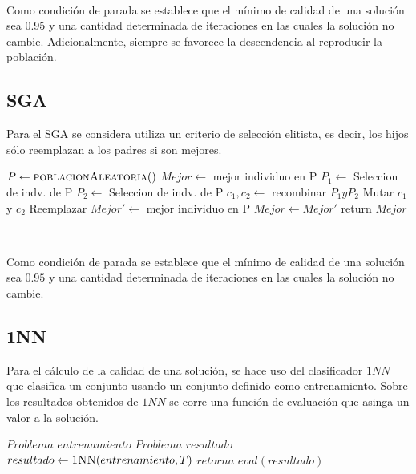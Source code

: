 \documentclass[11pt]{article}
\begin{document}
    ~\ 

    Como condición de parada se establece que el mínimo de calidad de una solución sea $0.95$ y una cantidad determinada de iteraciones en las cuales la solución no cambie. Adicionalmente, siempre se favorece la descendencia al reproducir la población.

    \subsection{SGA}
    Para el SGA se considera utiliza un criterio de selección elitista, es decir, los hijos sólo reemplazan a los padres si son mejores. \\

    {\fontsize{10}{12}\selectfont
    \begin{algorithmic}
            \State $P \gets \Call{poblacionAleatoria}$
            \State $Mejor \gets $ mejor individuo en P
                \State $P_1 \gets $ Seleccion de indv. de P  
                \State $P_2 \gets $ Seleccion de indv. de P 
                \State $c_1,c_2 \gets $ recombinar $P_1 y P_2$
                \State Mutar $c_1$ y $c_2$ 
                    \State Reemplazar
                \EndIf
                \State $Mejor' \gets $ mejor individuo en P 
                    \State $Mejor \gets Mejor'$
                \EndIf
            \EndWhile
            \State return $Mejor$
        \EndFunction
    \end{algorithmic}
    }

    ~\ 

    Como condición de parada se establece que el mínimo de calidad de una solución sea $0.95$ y una cantidad determinada de iteraciones en las cuales la solución no cambie.

\subsection{1NN}
    Para el cálculo de la calidad de una solución, se hace uso del clasificador $1NN$ que clasifica un conjunto usando un conjunto definido como entrenamiento. Sobre los resultados obtenidos de $1NN$ se corre una función de evaluación que asinga un valor a la solución. \\

    {\fontsize{10}{10}\selectfont
    \begin{algorithmic}
            \State $Problema$  $entrenamiento$
            \State $Problema$  $resultado$
            \State $resultado \gets \Call{1NN}{entrenamiento, T}$
            \State $retorna$ $eval(resultado)$
        \EndFunction
    \end{algorithmic}
    }
\end{document}
